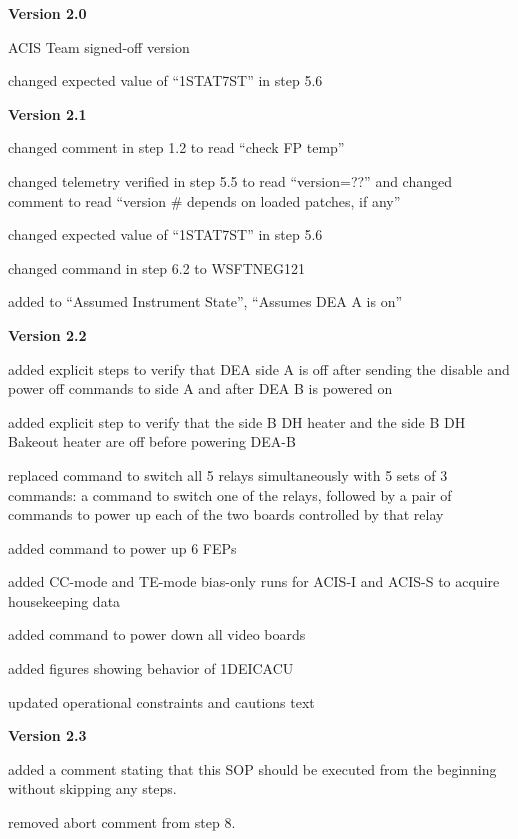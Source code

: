 \documentclass[11pt]{article}
\begin{document}
\item {\bf Version 2.0}
\bi
\item ACIS Team signed-off version
\item changed expected value of ``1STAT7ST'' in step 5.6
\ei

\item {\bf Version 2.1}
\bi
\item changed comment in step 1.2 to read ``check FP temp''
\item changed telemetry verified in step 5.5 to read ``version=??''
  and changed comment to read ``version \# depends on loaded patches,
  if any''
\item changed expected value of ``1STAT7ST'' in step 5.6
\item changed command in step 6.2 to WSFTNEG121
\item added to ``Assumed Instrument State'', ``Assumes DEA A is on''
\ei

\item {\bf Version 2.2}
\bi
\item added explicit steps to verify that DEA side A is off after sending the
disable and power off commands to side A and after DEA B is powered on
\item added explicit step to verify that the side B DH heater and the side B 
DH Bakeout heater are off before powering DEA-B
\item replaced command to switch all 5 relays simultaneously with 5 sets of 3 
commands: a command to switch one of the relays, followed by a pair of commands
to power up each of the two boards controlled by that relay
\item added command to power up 6 FEPs
\item added CC-mode and TE-mode bias-only runs for ACIS-I and ACIS-S to
acquire housekeeping data
\item added command to power down all video boards
\item added figures showing behavior of 1DEICACU
\item updated operational constraints and cautions text
\ei

\item {\bf Version 2.3}
\bi
\item added a comment stating that this SOP should be executed from the beginning
without skipping any steps.
\item removed abort comment from step 8.
\ei

\ed
\end{document}
